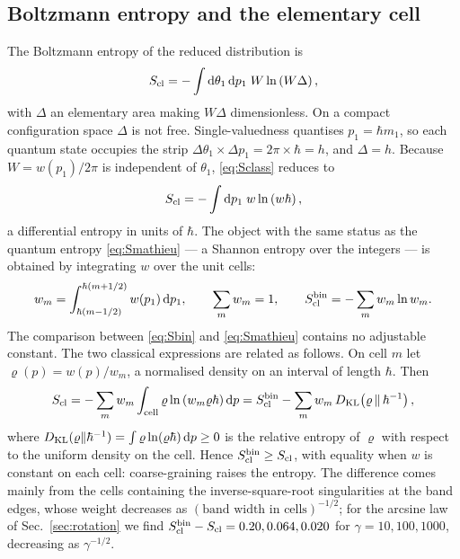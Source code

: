 \documentclass[preprint,12pt]{elsarticle}
\newcommand{\dd}{\mathrm{d}}
\newcommand{\Scl}{S_{\rm cl}}
\begin{document}
\subsection{Boltzmann entropy and the elementary cell}
\label{sec:cell}

The Boltzmann entropy of the reduced distribution is
\begin{equation}
\Scl=-\int\dd\theta_{1}\,\dd p_{1}\;W\ln\left(W\Delta\right),
\label{eq:Sclass}
\end{equation}
with $\Delta$ an elementary area making $W\Delta$ dimensionless. On a compact
configuration space $\Delta$ is not free. Single-valuedness quantises
$p_{1}=\hbar m_{1}$, so each quantum state occupies the strip
$\Delta\theta_{1}\times\Delta p_{1}=2\pi\times\hbar=h$, and $\Delta=h$. Because
$W=w(p_{1})/2\pi$ is independent of $\theta_{1}$, \eqref{eq:Sclass} reduces to
\begin{equation}
\Scl=-\int\dd p_{1}\;w\ln\left(w\hbar\right),
\label{eq:Sdiff}
\end{equation}
a differential entropy in units of $\hbar$. The object with the same status as
the quantum entropy \eqref{eq:Smathieu} --- a Shannon entropy over the integers
--- is obtained by integrating $w$ over the unit cells:
\begin{equation}
w_{m}=\int_{\hbar(m-1/2)}^{\hbar(m+1/2)}w(p_{1})\,\dd p_{1},\qquad
\sum_{m}w_{m}=1,\qquad
\Scl^{\rm bin}=-\sum_{m}w_{m}\ln w_{m}.
\label{eq:Sbin}
\end{equation}
The comparison between \eqref{eq:Sbin} and \eqref{eq:Smathieu} contains no
adjustable constant. The two classical expressions are related as follows. On
cell $m$ let $\varrho(p)=w(p)/w_{m}$, a normalised density on an interval of
length $\hbar$. Then
\begin{equation}
\Scl=-\sum_{m}w_{m}\int_{\rm cell}\varrho\ln\left(w_{m}\varrho\hbar\right)\dd p
=\Scl^{\rm bin}-\sum_{m}w_{m}\,D_{\rm KL}\!\left(\varrho\,\Vert\,
\hbar^{-1}\right),
\end{equation}
where $D_{\rm KL}(\varrho\Vert\hbar^{-1})=\int\varrho\ln(\varrho\hbar)\,\dd p
\ge0$ is the relative entropy of $\varrho$ with respect to the uniform density on
the cell. Hence $\Scl^{\rm bin}\ge\Scl$, with equality when $w$ is constant on
each cell: coarse-graining raises the entropy. The difference comes mainly from
the cells containing the inverse-square-root singularities at the band edges,
whose weight decreases as $(\text{band width in cells})^{-1/2}$; for the arcsine
law of Sec.~\ref{sec:rotation} we find $\Scl^{\rm bin}-\Scl=0.20,0.064,0.020$
for $\gamma=10,100,1000$, decreasing as $\gamma^{-1/2}$.
\end{document}
